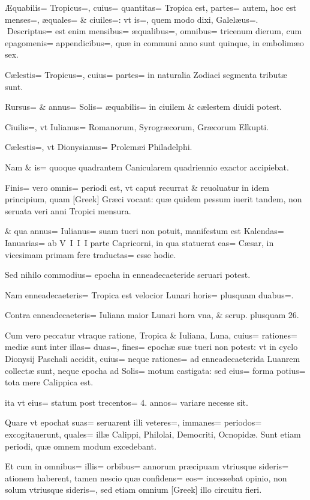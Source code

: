 \begin{parnumbers}

Æquabilis= Tropicus=, cuius= quantitas= Tropica est, partes= autem, hoc est menses=, æquales= \& ciuiles=: vt is=,  quem modo dixi, Galelæus=.
Descriptus= est enim mensibus= æqualibus=, omnibus= tricenum dierum, cum epagomenis= appendicibus=, quæ in communi anno sunt quinque, in embolimæo sex.

Cælestis= Tropicus=, cuius= partes= in naturalia Zodiaci segmenta tributæ sunt.

Rursus= \& annus= Solis= æquabilis= in ciuilem \& cælestem diuidi potest.

Ciuilis=, vt Iulianus= Romanorum, Syrogræcorum, Græcorum Elkupti.

Cælestis=, vt Dionysianus= Prolemæi Philadelphi.

Nam \& is= quoque quadrantem Canicularem quadriennio exactor accipiebat.

Finis= vero omnis= periodi est, vt caput recurrat \& reuoluatur in idem principium, quam [Greek] Græci vocant: quæ quidem pessum iuerit tandem, non seruata veri anni Tropici mensura.

\& qua annus= Iulianus=  suam tueri non potuit, manifestum est Kalendas= Ianuarias= ab V I I I parte Capricorni, in qua statuerat eas= Cæsar, in vicesimam primam fere traductas= esse hodie.

Sed nihilo commodius= epocha in enneadecaeteride seruari potest.

Nam enneadecaeteris= Tropica est velocior Lunari horis= plusquam duabus=.

Contra enneadecaeteris= Iuliana maior Lunari hora vna, \& scrup. plusquam 26.

Cum vero peccatur vtraque ratione, Tropica \& Iuliana, Luna, cuius= rationes= mediæ sunt inter illas= duas=, fines= epochæ suæ tueri non potest: vt in cyclo Dionysij Paschali accidit, cuius= neque rationes= ad enneadecaeterida Luanrem collectæ sunt, neque epocha ad Solis= motum castigata: sed eius= forma potius= tota mere Calippica est.

ita vt eius= statum post trecentos=  4. annos= variare necesse sit.

Quare vt epochat suas= seruarent illi veteres=, immanes= periodos= excogitauerunt, quales= illæ Calippi, Philolai, Democriti, Ocnopidæ. Sunt etiam periodi, quæ omnem modum excedebant.

Et cum in omnibus= illis= orbibus= annorum præcipuam vtriusque sideris= ationem haberent, tamen nescio quæ confidens= eos= incessebat opinio, non solum vtriusque sideris=, sed etiam omnium [Greek] illo circuitu fieri.


\end{parnumbers}
